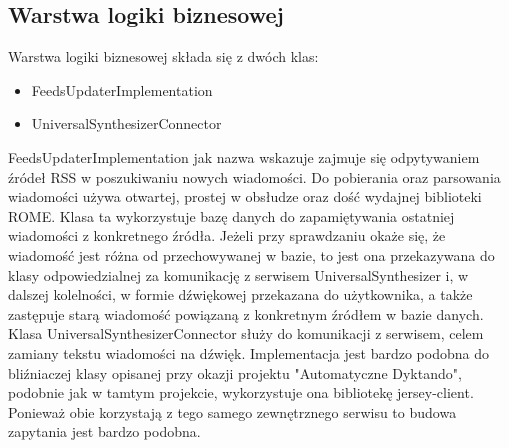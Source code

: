\subsection{Warstwa logiki biznesowej}
Warstwa logiki biznesowej składa się z dwóch klas:
\begin{itemize}
	\item FeedsUpdaterImplementation
	\item UniversalSynthesizerConnector
\end{itemize}
FeedsUpdaterImplementation jak nazwa wskazuje zajmuje się odpytywaniem źródeł RSS w poszukiwaniu nowych wiadomości. 
Do pobierania oraz parsowania wiadomości używa otwartej, prostej w obsłudze oraz dość wydajnej biblioteki ROME. Klasa ta wykorzystuje bazę danych do zapamiętywania ostatniej wiadomości z konkretnego źródła. Jeżeli przy sprawdzaniu okaże się, że wiadomość jest różna od przechowywanej w bazie, to jest ona przekazywana do klasy odpowiedzialnej za komunikację z serwisem UniversalSynthesizer i, w dalszej kolelności, w formie dźwiękowej przekazana do użytkownika, a także zastępuje starą wiadomość powiązaną z konkretnym źródłem w bazie danych.
Klasa UniversalSynthesizerConnector służy do komunikacji z serwisem, celem zamiany tekstu wiadomości na dźwięk. Implementacja jest bardzo podobna do bliźniaczej klasy opisanej przy okazji projektu "Automatyczne Dyktando", podobnie jak w tamtym projekcie, wykorzystuje ona bibliotekę jersey-client. Ponieważ obie korzystają z tego samego zewnętrznego serwisu to budowa zapytania jest bardzo podobna.

